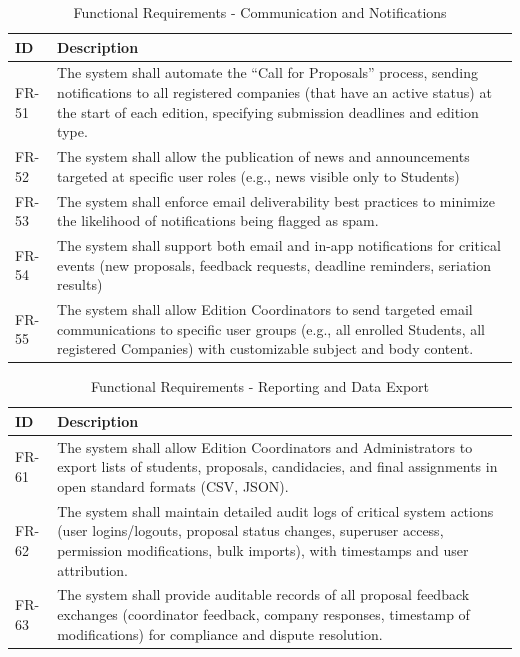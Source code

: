 {
    \begin{table}[H]
        \centering
        \caption{Functional Requirements - Communication and Notifications}
        \begin{tabular}{|l|p{12cm}|} %
            \hline
            \textbf{ID} & \textbf{Description} \\ \hline
            FR-51 & The system shall automate the “Call for Proposals” process, sending notifications to all registered companies (that have an active status) at the start of each edition, specifying submission deadlines and edition type. \\ \hline
            FR-52 & The system shall allow the publication of news and announcements targeted at specific user roles (e.g., news visible only to Students) \\ \hline
            FR-53 & The system shall enforce email deliverability best practices to minimize the likelihood of notifications being flagged as spam. \\ \hline
            FR-54 & The system shall support both email and in-app notifications for critical events (new proposals, feedback requests, deadline reminders, seriation results) \\ \hline
            FR-55 & The system shall allow Edition Coordinators to send targeted email communications to specific user groups (e.g., all enrolled Students, all registered Companies) with customizable subject and body content. \\ \hline
        \end{tabular}   
    \end{table}    
}

{
    \begin{table}[H]
        \centering
        \caption{Functional Requirements - Reporting and Data Export}
        \begin{tabular}{|l|p{12cm}|} %
            \hline
            \textbf{ID} & \textbf{Description} \\ \hline
            FR-61 & The system shall allow Edition Coordinators and Administrators to export lists of students, proposals, candidacies, and final assignments in open standard formats (CSV, JSON). \\ \hline
            FR-62 & The system shall maintain detailed audit logs of critical system actions (user logins/logouts, proposal status changes, superuser access, permission modifications, bulk imports), with timestamps and user attribution. \\ \hline
            FR-63 & The system shall provide auditable records of all proposal feedback exchanges (coordinator feedback, company responses, timestamp of modifications) for compliance and dispute resolution. \\ \hline
        \end{tabular}
    \end{table}    
}

